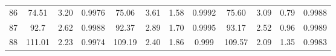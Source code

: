 \begin{table}[hb]
{\begin{tabular}{cccccccccccc}
86                               & 74.51                         & 3.20                            & 0.9976                    & 75.06                         & 3.61                               & 1.58                    & 0.9992                    & 75.60                         & 3.09                            & 0.79                    & 0.9988                     \\
87                               & 92.7                          & 2.62                            & 0.9988                    & 92.37                         & 2.89                               & 1.70                    & 0.9995                    & 93.17                         & 2.52                            & 0.96                    & 0.9989                     \\
88                               & 111.01                        & 2.23                            & 0.9974                    & 109.19                        & 2.40                               & 1.86                    & 0.999                     & 109.57                        & 2.09                            & 1.35                    & 0.9983                     \\
\bottomrule
\end{tabular}
}
\end{table}

